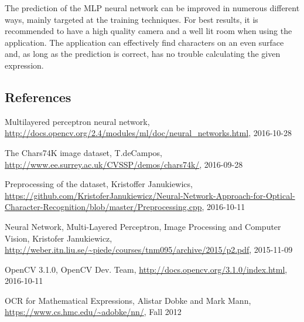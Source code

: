 \documentclass[12pt]{report}
\begin{document}
\newline
\newline
The prediction of the MLP neural network can be improved in numerous different ways, mainly targeted at the training techniques. For best results, it is recommended to have a high quality camera and a well lit room when using the application. The application can effectively find characters on an even surface and, as long as the prediction is correct, has no trouble calculating the given expression.



\newpage
\renewcommand{\bibname}{}
\begin{thebibliography}{}
\section*{References}

 Multilayered perceptron neural network, \url{http://docs.opencv.org/2.4/modules/ml/doc/neural_networks.html}, 2016-10-28

 The Chars74K image dataset, T.deCampos, \url{http://www.ee.surrey.ac.uk/CVSSP/demos/chars74k/}, 2016-09-28 

 Preprocessing of the dataset, Kristoffer Janukiewics,  
\url{https://github.com/KristoferJanukiewicz/Neural-Network-Approach-for-Optical-Character-Recognition/blob/master/Preprocessing.cpp}, 2016-10-11 

 Neural Network, Multi-Layered Perceptron, Image Processing and Computer Vision, Kristofer Janukiewicz, \url{http://weber.itn.liu.se/~piede/courses/tnm095/archive/2015/p2.pdf}, 2015-11-09

 OpenCV 3.1.0, OpenCV Dev. Team, \url{http://docs.opencv.org/3.1.0/index.html}, 2016-10-11

 OCR for Mathematical Expressions, Alistar Dobke and Mark Mann, \url{https://www.cs.hmc.edu/~adobke/nn/}, Fall 2012


\end{thebibliography}
\end{document}
